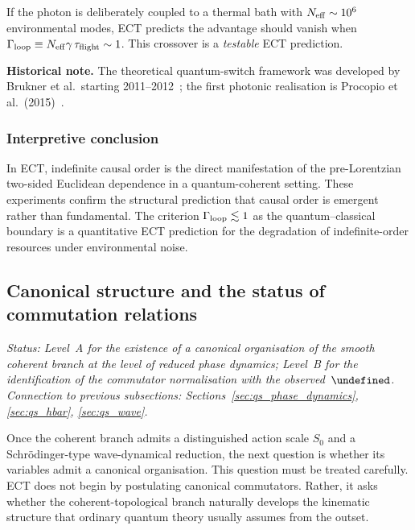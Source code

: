 \documentclass[11pt,a4paper]{article}
\let\hbar\undefined
\numberwithin{equation}{section}
\begin{document}
If the photon is deliberately coupled to a thermal bath with
$N_{\rm eff}\sim10^{6}$ environmental modes, ECT predicts the
advantage should vanish when
$\Gamma_{\rm loop}\equiv N_{\rm eff}\gamma\,\tau_{\rm flight}\sim1$.
This crossover is a \emph{testable} ECT prediction.

\textbf{Historical note.}
The theoretical quantum-switch framework was developed by Brukner et al.\
starting 2011--2012~\cite{Chiribella2012}; the first photonic
realisation is Procopio et al.\ (2015)~\cite{Procopio2015}.

\subsubsection*{Interpretive conclusion}

In ECT, indefinite causal order is the direct manifestation of the
pre-Lorentzian two-sided Euclidean dependence in a quantum-coherent
setting.
These experiments confirm the structural prediction that causal order
is emergent rather than fundamental.
The criterion $\Gamma_{\rm loop}\lesssim1$ as the quantum--classical
boundary is a quantitative ECT prediction for the degradation of
indefinite-order resources under environmental noise.

\subsection{Canonical structure and the status of commutation relations}
\label{sec:qs_ccr}

\textit{Status: Level~A for the existence of a canonical organisation
of the smooth coherent branch at the level of reduced phase dynamics;
Level~B for the identification of the commutator normalisation with
the observed~$\hbar$.
Connection to previous subsections:
Sections~\ref{sec:qs_phase_dynamics}, \ref{sec:qs_hbar},
\ref{sec:qs_wave}.}

\medskip
Once the coherent branch admits a distinguished action scale $S_0$ and
a Schr\"odinger-type wave-dynamical reduction, the next question is
whether its variables admit a canonical organisation.
This question must be treated carefully.
ECT does not begin by postulating canonical commutators.
Rather, it asks whether the coherent-topological branch naturally
develops the kinematic structure that ordinary quantum theory usually
assumes from the outset.
\end{document}
